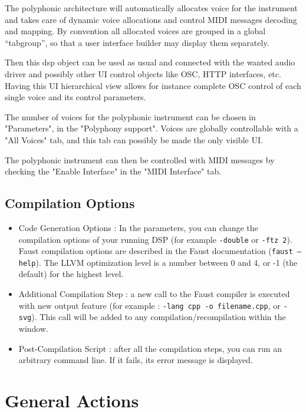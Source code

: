 \documentclass[a4paper]{article}
\begin{document}
The polyphonic architecture will automatically allocates voice for the instrument and takes care of dynamic voice allocations and control MIDI messages decoding and mapping.  By convention all allocated voices are grouped in a global “tabgroup”, so that a user interface builder may display them separately. 

Then this dsp object can be used as usual and connected with the wanted audio driver and possibly other UI control objects like OSC, HTTP interfaces, etc. Having this UI hierarchical view allows for instance complete OSC control of each single voice and its control parameters. 

The number of voices for the polyphonic instrument can be chosen in "Parameters", in the "Polyphony support". Voices are globally controllable with a "All Voices" tab, and this tab can possibly be made the only visible UI. 

The polyphonic instrument can then be controlled with MIDI messages by checking the  "Enable Interface" in the "MIDI Interface" tab.

\subsection{Compilation Options}

\begin{itemize}

\item Code Generation Options : In the parameters, you can change the compilation options of your running DSP (for example \texttt{-double} or \texttt{-ftz 2}). Faust compilation options are described in the Faust documentation (\texttt{faust --help}). The LLVM optimization level is a number between 0 and 4, or -1 (the default) for the highest level.

\item Additional Compilation Step : a new call to the Faust compiler is executed with new output feature (for example : \texttt{-lang cpp -o filename.cpp}, or \texttt{-svg}). This call will be added to any compilation/recompilation within the window.

\item Post-Compilation Script : after all the compilation steps, you can run an arbitrary command line. If it fails, its error message is displayed.

\end{itemize}

\section{General Actions}
\end{document}
